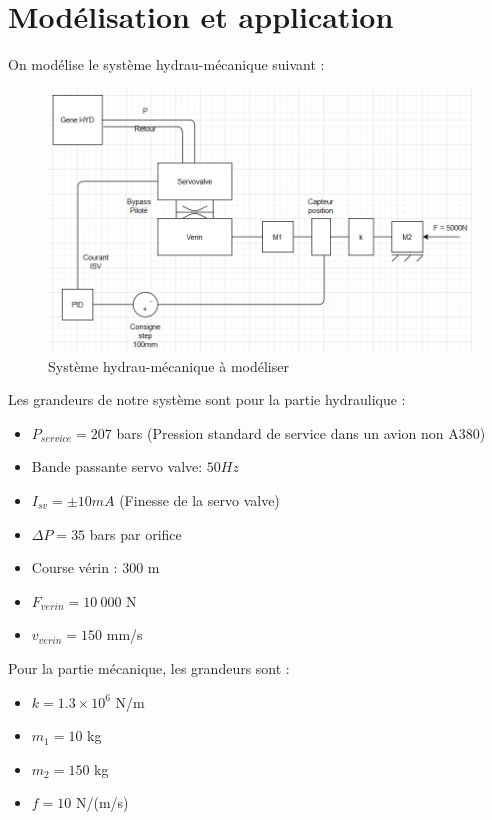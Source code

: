 \documentclass[a4paper,12pt,calibri,oneside,openany]{book}
\theoremstyle{break}
\begin{document}
\section{Modélisation et application}
On modélise le système hydrau-mécanique suivant : 
\begin{figure}[H]
	\centering
	\includegraphics[width=\linewidth]{systeme1}
	\caption{Système hydrau-mécanique à modéliser}
\end{figure}
\clearpage
Les grandeurs de notre système sont pour la partie hydraulique : 
\begin{itemize}
	\item $P_{service} = 207$ bars (Pression standard de service dans un avion non A380)
	\item Bande passante servo valve: $50Hz$
	\item $I_{sv} = \pm 10mA$ (Finesse de la servo valve)
	\item $\Delta P = 35$ bars par orifice
	\item Course vérin : $300$ m 
	\item $F_{verin} = 10\ 000$ N 
	\item $v_{verin} = 150$ mm/s 
\end{itemize}


Pour la partie mécanique, les grandeurs sont :

\begin{itemize}
\item  $k=1.3\times 10^6$ N/m
\item  $m_1 = 10$ kg
\item $m_2 = 150$ kg
\item $f = 10$ N/(m/s)
\end{itemize}
\end{document}
